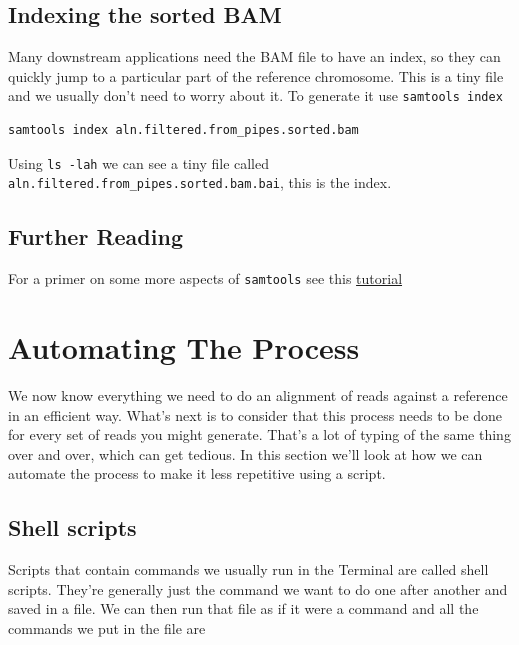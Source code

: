 \documentclass[]{book}
\begin{document}
\hypertarget{indexing-the-sorted-bam}{%
\section{Indexing the sorted BAM}\label{indexing-the-sorted-bam}}

Many downstream applications need the BAM file to have an index, so they can quickly jump to a particular part of the reference chromosome. This is a tiny file and we usually don't need to worry about it. To generate it use \texttt{samtools\ index}

\begin{verbatim}
samtools index aln.filtered.from_pipes.sorted.bam
\end{verbatim}

Using \texttt{ls\ -lah} we can see a tiny file called \texttt{aln.filtered.from\_pipes.sorted.bam.bai}, this is the index.

\hypertarget{further-reading-3}{%
\section{Further Reading}\label{further-reading-3}}

For a primer on some more aspects of \texttt{samtools} see this \href{http://quinlanlab.org/tutorials/samtools/samtools.html}{tutorial}

\hypertarget{automating-the-process}{%
\chapter{Automating The Process}\label{automating-the-process}}

We now know everything we need to do an alignment of reads against a reference in an efficient way. What's next is to consider that this process needs to be done for every set of reads you might generate. That's a lot of typing of the same thing over and over, which can get tedious. In this section we'll look at how we can automate the process to make it less repetitive using a script.

\hypertarget{shell-scripts}{%
\section{Shell scripts}\label{shell-scripts}}

Scripts that contain commands we usually run in the Terminal are called shell scripts. They're generally just the command we want to do one after another and saved in a file. We can then run that file as if it were a command and all the commands we put in the file are
\end{document}
